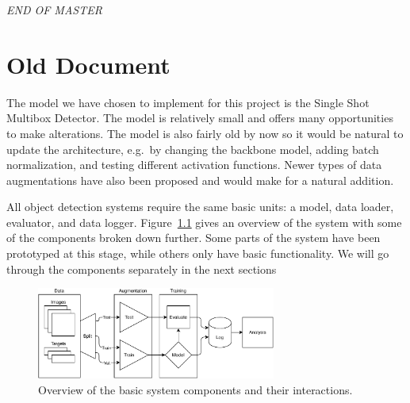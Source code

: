\vspace*{\fill}
\begin{center}
    \textit{END OF MASTER}\thispagestyle{empty}
\end{center}
\vspace*{\fill}
%

\chapter{Old Document}

The model we have chosen to implement for this project is the Single Shot Multibox Detector.
The model is relatively small and offers many opportunities to make alterations.
The model is also fairly old by now so it would be natural to update the architecture, e.g.~by changing the backbone model, adding batch normalization, and testing different activation functions.
Newer types of data augmentations have also been proposed and would make for a natural addition.

All object detection systems require the same basic units: a model, data loader, evaluator, and data logger.
Figure~\ref{fig:sys} gives an overview of the system with some of the components broken down further.
Some parts of the system have been prototyped at this stage, while others only have basic functionality.
We will go through the components separately in the next sections

\begin{figure}[htb]
  \centering
  \includegraphics[width=0.7\textwidth]{figs/system.pdf}
  \caption[System overview]{Overview of the basic system components and their interactions.}\label{fig:sys}
\end{figure}

